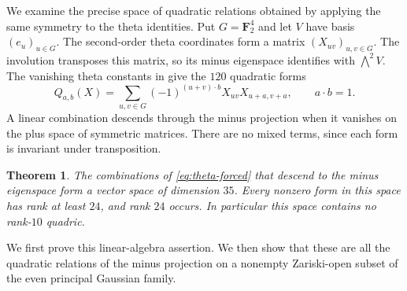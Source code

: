 \documentclass[11pt]{article}
\newtheorem{theorem}{Theorem}[section]
\theoremstyle{definition}
\theoremstyle{remark}
\begin{document}
We examine the precise space of quadratic relations obtained by applying the same symmetry to the theta identities. Put $G=\mathbf F_2^4$ and let $V$ have basis $(e_u)_{u\in G}$. The second-order theta coordinates form a matrix $(X_{uv})_{u,v\in G}$. The involution transposes this matrix, so its minus eigenspace identifies with $\bigwedge^2V$. The vanishing theta constants in \cite[Lemma~2.3 and \S3.5]{vG96} give the $120$ quadratic forms
\begin{equation}\label{eq:theta-forced}
 Q_{a,b}(X)=\sum_{u,v\in G}(-1)^{(u+v)\cdot b}
 X_{uv}X_{u+a,v+a},\qquad a\cdot b=1.
\end{equation}
A linear combination descends through the minus projection when it vanishes on the plus space of symmetric matrices. There are no mixed terms, since each form is invariant under transposition.

\begin{theorem}\label{thm:theta-rank}
The combinations of \eqref{eq:theta-forced} that descend to the minus eigenspace form a vector space of dimension $35$. Every nonzero form in this space has rank at least $24$, and rank $24$ occurs. In particular this space contains no rank-$10$ quadric.
\end{theorem}

We first prove this linear-algebra assertion. We then show that these
are all the quadratic relations of the minus projection on a nonempty
Zariski-open subset of the even principal Gaussian family.
\end{document}
